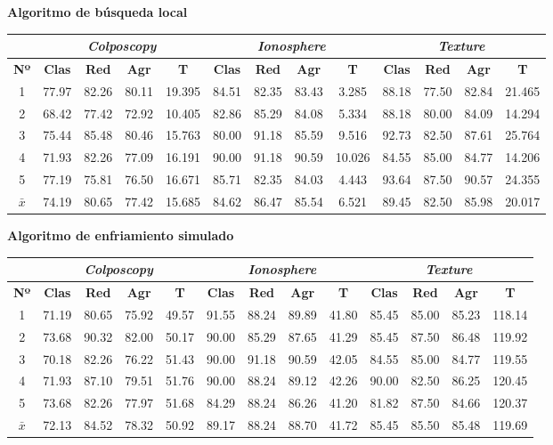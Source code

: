 \documentclass[12pt]{article}
\begin{document}
{\color{red}\textbf{Algoritmo de búsqueda local}}

\begin{table}[ht!]
\begin{tabular}{ccccc|cccc|cccc}
\centering
 & \multicolumn{4}{c}{\textit{Colposcopy}} & \multicolumn{4}{c}{\textit{Ionosphere}} & \multicolumn{4}{c}{\textit{Texture}} \\ \hline
\textbf{Nº} & \textbf{Clas} & \textbf{Red} & \textbf{Agr} & \textbf{T} & \textbf{Clas} & \textbf{Red} & \textbf{Agr} & \textbf{T} & \textbf{Clas} & \textbf{Red} & \textbf{Agr} & \textbf{T} \\ \hline
1 & 77.97 & 82.26 & 80.11 & 19.395 & 84.51 & 82.35 & 83.43 & 3.285 & 88.18 & 77.50 & 82.84 & 21.465\\
2 & 68.42 & 77.42 & 72.92 & 10.405 & 82.86 & 85.29 & 84.08 & 5.334 & 88.18 & 80.00 & 84.09 & 14.294\\
3 & 75.44 & 85.48 & 80.46 & 15.763 & 80.00 & 91.18 & 85.59 & 9.516 & 92.73 & 82.50 & 87.61 & 25.764\\
4 & 71.93 & 82.26 & 77.09 & 16.191 & 90.00 & 91.18 & 90.59 & 10.026 & 84.55 & 85.00 & 84.77 & 14.206\\
5 & 77.19 & 75.81 & 76.50 & 16.671 & 85.71 & 82.35 & 84.03 & 4.443 & 93.64 & 87.50 & 90.57 & 24.355\\
\hline
$\bar{x}$  & 74.19 & 80.65 & 77.42 & 15.685 & 84.62 & 86.47 & 85.54 & 6.521 & 89.45 & 82.50 & 85.98 & 20.017
\end{tabular}
\end{table}

\textbf{Algoritmo de enfriamiento simulado}

\begin{table}[ht!]
\begin{tabular}{ccccc|cccc|cccc}
\centering
 & \multicolumn{4}{c}{\textit{Colposcopy}} & \multicolumn{4}{c}{\textit{Ionosphere}} & \multicolumn{4}{c}{\textit{Texture}} \\ \hline
\textbf{Nº} & \textbf{Clas} & \textbf{Red} & \textbf{Agr} & \textbf{T} & \textbf{Clas} & \textbf{Red} & \textbf{Agr} & \textbf{T} & \textbf{Clas} & \textbf{Red} & \textbf{Agr} & \textbf{T} \\ \hline
1 & 71.19 & 80.65 & 75.92 & 49.57 & 91.55 & 88.24 & 89.89 & 41.80 & 85.45 & 85.00 & 85.23 & 118.14\\
2 & 73.68 & 90.32 & 82.00 & 50.17 & 90.00 & 85.29 & 87.65 & 41.29 & 85.45 & 87.50 & 86.48 & 119.92\\
3 & 70.18 & 82.26 & 76.22 & 51.43 & 90.00 & 91.18 & 90.59 & 42.05 & 84.55 & 85.00 & 84.77 & 119.55\\
4 & 71.93 & 87.10 & 79.51 & 51.76 & 90.00 & 88.24 & 89.12 & 42.26 & 90.00 & 82.50 & 86.25 & 120.45\\
5 & 73.68 & 82.26 & 77.97 & 51.68 & 84.29 & 88.24 & 86.26 & 41.20 & 81.82 & 87.50 & 84.66 & 120.37\\
\hline
$\bar{x}$ & 72.13 & 84.52 & 78.32 & 50.92 & 89.17 & 88.24 & 88.70 & 41.72 & 85.45 & 85.50 & 85.48 & 119.69
\end{tabular}
\end{table}
\end{document}
